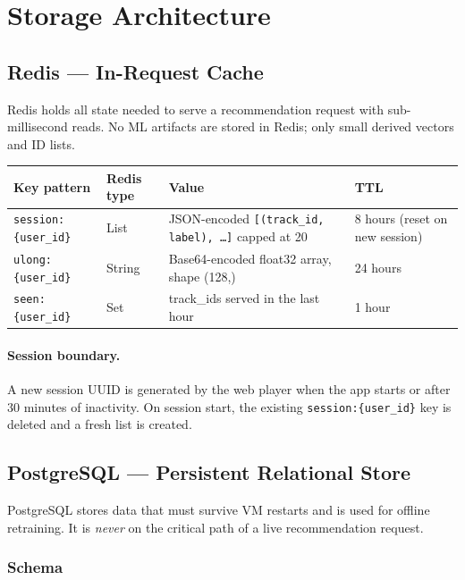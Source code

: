 \documentclass[11pt]{article}
\begin{document}
\section{Storage Architecture}

\subsection{Redis --- In-Request Cache}

Redis holds all state needed to serve a recommendation request with sub-millisecond reads.
No ML artifacts are stored in Redis; only small derived vectors and ID lists.

\begin{longtable}{@{}lllp{4.5cm}@{}}
\toprule
Key pattern & Redis type & Value & TTL \\
\midrule
\texttt{session:\{user\_id\}} & List &
  JSON-encoded \texttt{[(track\_id, label), \ldots]} capped at 20 &
  8 hours (reset on new session) \\[4pt]
\texttt{ulong:\{user\_id\}} & String &
  Base64-encoded float32 array, shape (128,) &
  24 hours \\[4pt]
\texttt{seen:\{user\_id\}} & Set &
  track\_ids served in the last hour &
  1 hour \\
\bottomrule
\end{longtable}

\paragraph{Session boundary.}
A new session UUID is generated by the web player when the app starts or after 30 minutes
of inactivity.  On session start, the existing \texttt{session:\{user\_id\}} key is deleted
and a fresh list is created.

\subsection{PostgreSQL --- Persistent Relational Store}

PostgreSQL stores data that must survive VM restarts and is used for offline retraining.
It is \emph{never} on the critical path of a live recommendation request.

\subsubsection{Schema}
\end{document}
